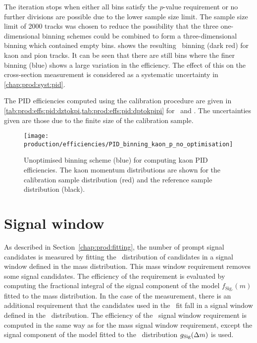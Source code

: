 The iteration stops when either all bins satisfy the $p$-value requirement or
no further divisions are possible due to the lower sample size limit.
The sample size limit of 2000 tracks was chosen to reduce the possibility that
the three one-dimensional binning schemes could be combined to form a
three-dimensional binning which contained empty bins.
 shows the resulting
\ptotetanspd\ binning (dark red) for kaon and pion tracks.
It can be seen that there are still bins where the finer binning (blue) shows a
large variation in the efficiency.
The effect of this on the cross-section measurement is considered as a
systematic uncertainty in \cref{chap:prod:syst:pid}.

The \acl{PID} efficiencies computed using the calibration procedure are given
in \cref{tab:prod:effs:pid:dztokpi,tab:prod:effs:pid:dptokpipi} for \DzToKpi\
and \DpToKpipi.
The uncertainties given are those due to the finite size of the calibration
sample.

\begin{figure}
  \centering
  \texttt{[image: production/efficiencies/PID\_binning\_kaon\_p\_no\_optimisation]}
  \caption{%
    Unoptimised binning scheme (blue) for computing kaon \ac{PID} efficiencies.
    The kaon momentum distributions are shown for the calibration sample
    distribution (red) and the reference sample distribution (black).
  }
  \label{fig:prod:effs:pid:binning:kaon_no_optimisation}
\end{figure}

\section{Signal window}
\label{chap:prod:effs:signal_window}

As described in Section~\ref{chap:prod:fitting}, the number of prompt signal
candidates is measured by fitting the \lnipchisq\ distribution of candidates in
a signal window defined in the mass distribution.
This mass window requirement removes some signal candidates.
The efficiency of the requirement is evaluated by computing the fractional
integral of the signal component of the model $f_{\text{Sig.}}(m)$ fitted to
the mass distribution.
In the case of the \PDstarp measurement, there is an additional requirement
that the candidates used in the \lnipchisq\ fit fall in a signal window defined
in the \deltam\ distribution.
The efficiency of the \deltam\ signal window requirement is computed in the
same way as for the mass signal window requirement, except the signal component
of the model fitted to the \deltam\ distribution $g_{\text{Sig}}(\Delta{m})$ is
used.

